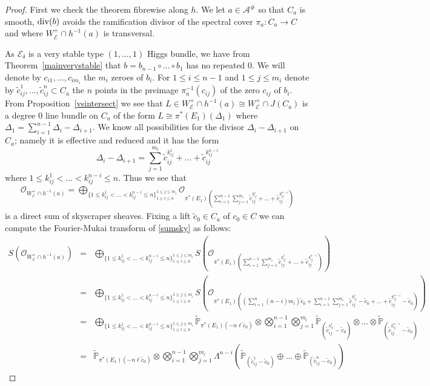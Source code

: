\documentclass[12pt]{article}
\numberwithin{equation}{section}
\renewcommand{\div}{{\rm div}}
\theoremstyle{remark}
\theoremstyle{definition}
\numberwithin{theorem}{section}
\def\beq{\begin{eqnarray}}
\def\eeq{\end{eqnarray}}
\def\bes{\begin{eqnarray*}}
\def\ees{\end{eqnarray*}}
\def\calE{{\mathcal E}}
\def\calA{{\mathcal{A}}}
\def\P{\mathbb{P}}
\def\calO{{\mathcal O}}
\renewcommand{\1}{\mathbbm{1}}
\begin{document}
\begin{proof} First we  check the theorem fibrewise along $h$.    We let $a\in \calA^\#$ so that   $C_a$ is smooth, $\div(b)$ avoids the ramification divisor of the spectral cover $\pi_a:C_a\to C$ and  where $W_\calE^+\cap h^{-1}(a)$ is transversal.
	
	As $\calE_\delta$ is a very stable  type $(1,\dots,1)$ Higgs bundle, we have from Theorem~\ref{mainverystable}  that $b=b_{n-1}\circ \dots \circ b_1$ has no repeated $0$. We will denote by $c_{i1},\dots,c_{im_i}$ the $m_i$ zeroes of $b_i$. For $1\leq i\leq n-1$ and $1\leq j \leq m_i$  denote by $\tilde{c}^{1}_{ij},\dots,\tilde{c}^{n}_{ij}\subset C_a$ the $n$ points in the preimage $\pi_a^{-1}(c_{ij})$ of the zero $c_{ij}$ of $b_i$.
	From Proposition~\ref{vsintersect} we see that  $L\in W_\calE^+\cap h^{-1}(a)\cong W_\calE^+ \cap J(C_a)$ is a degree $0$ line bundle on $C_a$ of the form $L\cong \pi^*(E_1)(\Delta_1)$ where $\Delta_1=\sum_{i=1}^{n-1} \Delta_i-\Delta_{i+1}$. We know all possibilities for the divisor $\Delta_i-\Delta_{i+1}$ on $C_a$; namely it is effective and reduced and it has the form $$\Delta_i-\Delta_{i+1}=\sum_{j=1}^{m_i} \tilde{c}^{k^1_{ij}}_{ij}+\dots+\tilde{c}^{k^{n-i}_{ij}}_{ij}$$ where  $1\leq k^1_{ij}< \dots < k^{n-i}_{ij}\leq n$. Thus we see that \beq \label{sumsky}\calO_{W_\calE^+\cap h^{-1}(a)}=\bigoplus_{\{1\leq k^1_{ij}< \dots < k^{n-i}_{ij}\leq n\}^{1\leq j \leq m_i}_{1\leq i\leq n}} \calO_{\pi^*(E_1)\left(\sum_{i=1}^{n-1}\sum_{j=1}^{m_i} \tilde{c}^{k^1_{ij}}_{ij}+\dots+\tilde{c}^{k^{n-i}_{ij}}_{ij}\right)}\eeq is a direct sum of skyscraper sheaves. 
	Fixing a lift $\tilde{c}_0\in C_a$ of $c_0\in C$ we can compute the Fourier-Mukai transform of \eqref{sumsky} as follows:
	\bes S(\calO_{W_\calE^+\cap h^{-1}(a)})&=& \bigoplus_{\{1\leq k^1_{ij}< \dots < k^{n-i}_{ij}\leq n\}^{1\leq j \leq m_i}_{1\leq i\leq n}} S\left(\calO_{\pi^*(E_1)\left(\sum_{i=1}^{n-1}\sum_{j=1}^{m_i} \tilde{c}^{k^1_{ij}}_{ij}+\dots+\tilde{c}^{k^{n-i}_{ij}}_{ij}\right)}\right)\\
	&=& \bigoplus_{\{1\leq k^1_{ij}< \dots < k^{n-i}_{ij}\leq n\}^{1\leq j \leq m_i}_{1\leq i\leq n}} S\left(\calO_{\pi^*(E_1)\left((\sum_{i=1}^n(n-i)m_i)\tilde{c}_0+\sum_{i=1}^{n-1}\sum_{j=1}^{m_i} \tilde{c}^{k^1_{ij}}_{ij}-\tilde{c}_0+\dots+\tilde{c}^{k^{n-i}_{ij}}_{ij}-\tilde{c}_0\right)}\right)\\ &=&\bigoplus_{\{1\leq k^1_{ij}< \dots < k^{n-i}_{ij}\leq n\}^{1\leq j \leq m_i}_{1\leq i\leq n}} \tilde{\P}_{\pi^*(E_1)(-n\ell \tilde{c}_0)}\otimes  \bigotimes_{i=1}^{n-1}\bigotimes_{j=1}^{m_i} \tilde{\P}_{( \tilde{c}^{k^1_{ij}}_{ij}-\tilde{c}_0)}\otimes \dots \otimes \tilde{\P}_{(\tilde{c}^{k^{n-i}_{ij}}_{ij}-\tilde{c}_0)}\\
	&=&  \tilde{\P}_{\pi^*(E_1)(-n\ell \tilde{c}_0)}\otimes \bigotimes_{i=1}^{n-1}\bigotimes_{j=1}^{m_i} \Lambda^{n-i} \left(\tilde{\P}_{(\tilde{c}^{1}_{ij}-\tilde{c}_0)}\oplus \dots \oplus \tilde{\P}_{(\tilde{c}^{n}_{ij}-\tilde{c}_0)} \right) 
	\ees
	

\end{proof}
\end{document}
